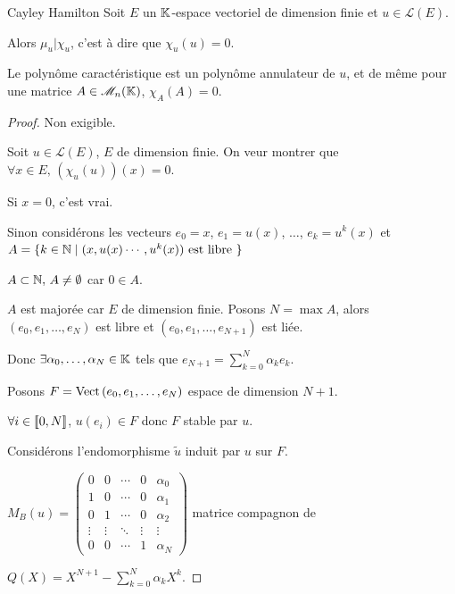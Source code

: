 \begin{theoreme}{Cayley Hamilton}{}
    Soit $E$ un $\mathbb{K}$-espace vectoriel de dimension finie et $u \in \mathscr L(E)$.

    Alors $\mu_u | \chi_u$, c'est à dire que $\chi_u(u) = 0$. 

    Le polynôme caractéristique est un polynôme annulateur de $u$, et de même 
    pour une matrice $A \in \mathscr M_n(\mathbb{K})$, $\chi_A(A) = 0$.
\end{theoreme}


\begin{proof}
    Non exigible.

    Soit $u \in \mathscr L(E)$, $E$ de dimension finie. On veur montrer que 
    $\forall x \in E, \, (\chi_u(u))(x) = 0$.

    Si $x = 0$, c'est vrai. 

    Sinon considérons les vecteurs $e_0 = x$, $e_1 = u(x)$, $\ldots$, $e_k = u^k(x)$ 
    et $A = \{k \in \mathbb{N} \mid (x, u(x) \cdots, u^k(x)) \text{ est libre }\}$

    $A \subset \mathbb{N}, \, A \neq \emptyset$ car $0 \in A$.

    $A$ est majorée car $E$ de dimension finie. Posons $N = \max A$, alors $(e_0, e_1, \ldots, e_N)$ est libre et
    $(e_0, e_1, \ldots, e_{N + 1})$ est liée.

    Donc $\exists \alpha_0, \ldots, \alpha_N \in \mathbb{K}$ tels que
    $e_{N + 1} = \sum_{k = 0 }^{ N } \alpha_k e_k$.

    Posons $F = \operatorname{Vect} \,(e_0, e_1, \ldots, e_N)$ espace de dimension $N + 1$. 

    $\forall i \in [\![0, N]\!]$, $u(e_i) \in F$ donc $F$ stable par $u$.

    Considérons l'endomorphisme $\tilde u $ induit par $u$ sur $F$.

    $M_B(u) = \begin{pmatrix}
        0 & 0 & \cdots & 0 & \alpha_0 \\
        1 & 0 & \cdots & 0 & \alpha_1 \\
        0 & 1 & \cdots & 0 & \alpha_2 \\
        \vdots & \vdots & \ddots & \vdots & \vdots \\
        0 & 0 & \cdots & 1 & \alpha_N
    \end{pmatrix}$ matrice compagnon de 
    
    $\displaystyle Q(X) = X^{N + 1} - \sum_{k = 0 }^{ N } \alpha_k X^k$.


\end{proof}
